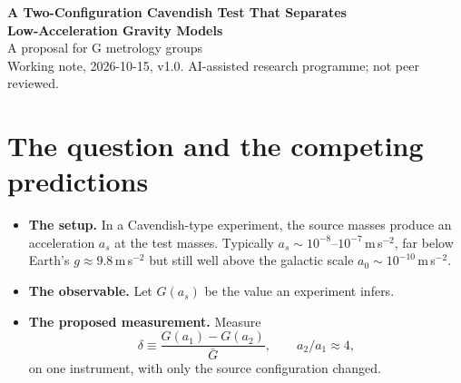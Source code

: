 \documentclass[10pt]{article}
\begin{document}
\begin{center}
{\Large\bfseries A Two-Configuration Cavendish Test That Separates\\ Low-Acceleration Gravity Models}\\[4pt]
{\large A proposal for G metrology groups}\\[6pt]
{\small Working note, 2026-10-15, v1.0. AI-assisted research programme; not peer reviewed.}
\end{center}

\begin{abstract}\noindent
Low-acceleration modifications of gravity make sharply different predictions for one inexpensive laboratory measurement. That measurement is the fractional change in the measured $G$ when the gravitational acceleration that the source masses produce at the test masses is changed by a factor of four, with everything else held fixed.

\begin{itemize}
\item \textbf{Source-field-boost model.} One published model applies a MOND-type boost to the source field alone (Klein's interpolation, $\beta\simeq1.3$, as used by Scarpa, Falomo \& Treves 2026). It predicts a shift of about 340\,ppm between configurations at half and twice the source acceleration of the Quinn et al.\ apparatus.
\item \textbf{Dark-energy-tied model.} A framework in which the low-acceleration scale is tied to dark energy and screened at laboratory scales predicts no measurable shift: $|\Delta G/G|<10^{-6}$, with a model value of order $10^{-20}$.
\item \textbf{Standard physics.} Newtonian gravity and general relativity predict zero.
\end{itemize}

Distinguishing the first prediction from the others needs a precision on the \emph{difference} of about 30--50\,ppm. Leading torsion-balance groups reach this today. We describe how to run the test on an existing apparatus: the two configurations, the systematics budget, blinding, and null checks. We also give the predictions in a form that can be checked directly.
\end{abstract}

\section{The question and the competing predictions}
\begin{itemize}
\item \textbf{The setup.} In a Cavendish-type experiment, the source masses produce an acceleration $a_s$ at the test masses. Typically $a_s\sim10^{-8}$--$10^{-7}$\,m\,s$^{-2}$, far below Earth's $g\approx9.8$\,m\,s$^{-2}$ but still well above the galactic scale $a_0\sim10^{-10}$\,m\,s$^{-2}$.
\item \textbf{The observable.} Let $G(a_s)$ be the value an experiment infers.
\item \textbf{The proposed measurement.} Measure
$$\delta\equiv\frac{G(a_1)-G(a_2)}{\bar G},\qquad a_2/a_1\approx4,$$
on one instrument, with only the source configuration changed.
\end{itemize}
\end{document}
